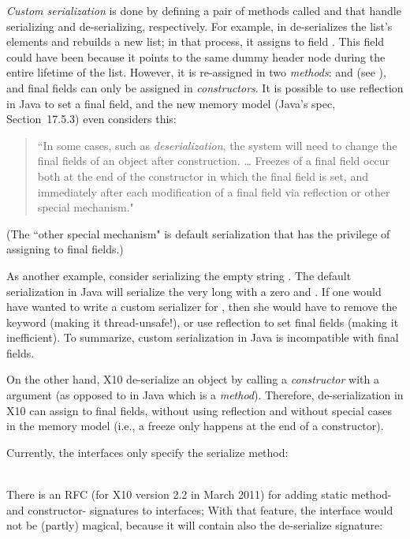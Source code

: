 \emph{Custom serialization} is done by defining a pair of methods called
     and 
    that handle serializing and de-serializing, respectively.
For example,  in 
    de-serializes the list's elements and rebuilds a new list;
    in that process, it assigns to field .
This field could have been  because it points to the same dummy header node
    during the entire lifetime of the list.
However, it is re-assigned in two \emph{methods}:
     and  (see ),
    and final fields can only be assigned in
    \emph{constructors}.
It is possible to use reflection in Java to set a final field,
    and the new memory model (Java's spec, Section~17.5.3)
    even considers this:
\begin{quote}
``In some cases, such as \emph{deserialization}, the system will need to change
    the final fields of an object after construction.
\ldots
Freezes of a final field occur both at the end of the constructor in which the final field is set,
    and immediately after each modification of a final field via reflection or other special mechanism."
\end{quote}
(The ``other special mechanism" is default serialization that has the privilege of assigning to final fields.)

As another example, consider serializing the empty string .
The default serialization in Java will serialize the very long  with a zero  and .
If one would have wanted to write a custom serializer for ,
    then she would have to remove the  keyword (making it thread-unsafe!),
    or use reflection to set final fields (making it inefficient).
To summarize, custom serialization in Java is incompatible with final fields.

On the other hand, X10 de-serialize an object by calling a \emph{constructor} with a 
    argument (as opposed to  in Java which is a \emph{method}).
Therefore, de-serialization in X10 can assign to final fields, without using reflection
    and without special cases in the memory model (i.e., a freeze only happens at the end of a constructor).

Currently, the  interfaces only specify the serialize method:

~~~~~~~~\\
There is an RFC (for X10 version 2.2 in March 2011) for adding static method- and constructor- signatures to interfaces;
    With that feature, the  interface would not be (partly) magical,
    because it will contain also the de-serialize signature:

